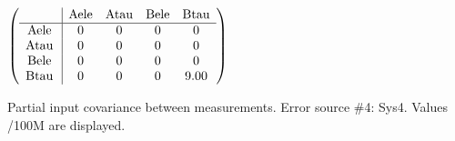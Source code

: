 \begin{table}[H]
\scriptsize
\begin{center}
\renewcommand{\arraystretch}{1.1}
\begin{math}\left(\begin{array}{c|cccc}
 & \mathrm{Aele} & 
\mathrm{Atau} & 
\mathrm{Bele} & 
\mathrm{Btau} \\
\hline
\mathrm{Aele} \hspace*{2pt} &  0 &  0 &  0 &  0 \\
\mathrm{Atau} \hspace*{2pt} &  0 &  0 &  0 &  0 \\
\mathrm{Bele} \hspace*{2pt} &  0 &  0 &  0 &  0 \\
\mathrm{Btau} \hspace*{2pt} &  0 &  0 &  0 &       9.00 \\
\end{array}\right)\end{math}
\caption{Partial input covariance between measurements. Error source \#4: Sys4. Values /100M are displayed.}
\renewcommand{\arraystretch}{1}
\end{center}
\end{table}
